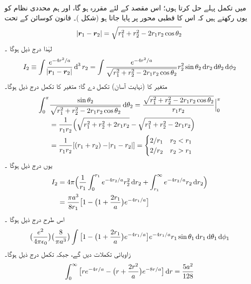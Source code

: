 میں    تکمل  پہلے حل کرتا ہوں؛ اس مقصد کے لئے    مقررہ ہو  گا، اور  ہم    محددی نظام کو یوں رکھتے ہیں کہ اس کا قطبی محور   پر  پایا جاتا ہو (شکل )۔ قانون کوسائن کے تحت 
\begin{align}
\abs{{{\boldsymbol{r}}}_{1}-{{\boldsymbol{r}}}_{2}}=\sqrt{r_{1}^{2}+r_{2}^{2}-2r_{1}r_{2}\cos{\theta_{2}}} 
\end{align}
 لہٰذا درج ذیل ہوگا ۔
\begin{align}
I_{2}\equiv\int\frac{e^{-4r^{2}/a}}{\abs{\kvec{r}_{1}-\kvec{r}_{2}}}\dif^{\,3}r_{2}=\int\frac{e^{-4r^{2}/a}}{\sqrt{r_{1}^{2}+r_{2}^{2}-2r_{1}r_{2}\cos{\theta_{2}}}}r_{2}^{2}\sin{\theta_{2}}\dif r_{2}\dif \theta_{2}\dif \phi_{2} 
\end{align}
 متغیر   کا (نہایت آسان) تکمل    دے گا؛  متغیر    کا تکمل درج ذیل ہوگا۔
\begin{align}
 \int_{0}^{\pi}&\frac{\sin{\theta_{2}}}{\sqrt{r_{1}^{2}+r_{2}^{2}-2r_{1}r_{2}\cos{\theta_{2}}}}\dif{\theta_{2}}=\frac{\sqrt{r_{1}^{2}+r_{2}^{2}-2r_{1}r_{2}\cos{\theta_{2}}}}{r_{1}r_{2}}\Big\vert_{0}^{\pi}\nonumber\\
  &=\frac{1}{r_{1}r_{2}}\Big(\sqrt{r_{1}^{2}+r_{2}^{2}+2r_{1}r_{2}}-\sqrt{r_{1}^{2}+r_{2}^{2}-2r_{1}r_{2}}\Big)\nonumber\\
&=\frac{1}{r_{1}r_{2}}[(r_{1}+r_{2})-\abs{r_{1}-r_{2}}]=\begin{cases} 2/r_{1} & r_{2}<r_{1}\\
2/r_{2}&r_{2}>r_{1}
\end{cases}
\end{align}
 یوں درج ذیل ہوگا ۔
\begin{align} 
I_{2}&=4\pi\Big (\frac{1}{r_{1}}\int_{0}^{r_{1}}e^{-4r_{2}/a}r_{2}^{2}\dif r_{2}+\int_{r_{1}}^{\infty}e^{-4r_{2}/a}r_{2}\dif r_{2}\Big)\nonumber\\
&=\frac{\pi a^{3}}{8r_{1}}\big[1-\big(1+\frac{2r_{1}}{a}\big)e^{-4r_{1}/a}\big]
\end{align}
 اس طرح   درج ذیل ہوگا ۔
\begin{align*}
\big(\frac{e^{2}}{4\pi\epsilon_{0}}\big)\big(\frac{8}{\pi a^{3}}\big )\int\big [1-\big (1+\frac{2r_{1}}{a}\big )e^{-4r_{1}/a}\big ]e^{-4r_{1}/a}r_{1}\sin{\theta_{1}}\dif r_{1}\dif \theta_{1}\dif \phi_{1} 
\end{align*}
 زاویائی تکملات   دیں گے،  جبکہ     تکمل درج ذیل ہوگا۔
\begin{align*}
\int_{0}^{\infty}\big [re^{-4r/a}-\big (r+\frac{2r^{2}}{a}\big )e^{-8r/a}\big ]\dif r=\frac{5a^{2}}{128} 
\end{align*}
